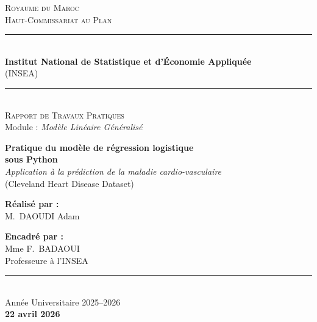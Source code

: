 \documentclass[11pt,a4paper,twoside]{report}
\theoremstyle{definition}
\begin{document}
\begin{titlepage}
  \begin{center}
    \vspace*{0.5cm}
    {\large\textsc{Royaume du Maroc}}\\[0.2cm]
    {\large\textsc{Haut-Commissariat au Plan}}\\[0.4cm]
    \rule{\textwidth}{0.5pt}\\[0.3cm]
    {\Large\bfseries Institut National de Statistique et d'Économie Appliquée}\\[0.15cm]
    {\normalsize (INSEA)}\\[0.2cm]
    \rule{\textwidth}{0.5pt}\\[2.5cm]

    {\large \textsc{Rapport de Travaux Pratiques}}\\[0.6cm]
    {\large Module : \emph{Modèle Linéaire Généralisé}}\\[2.5cm]

    \begin{tcolorbox}[colback=insea!8,colframe=insea,arc=4pt,boxrule=1pt]
    \centering
    {\Huge\bfseries\color{insea} Pratique du modèle de régression logistique\\[0.3em]
    sous Python}\\[0.8em]
    {\Large\itshape Application à la prédiction de la maladie cardio-vasculaire}\\[0.4em]
    {\large (Cleveland Heart Disease Dataset)}
    \end{tcolorbox}

    \vfill

    \begin{minipage}{0.45\textwidth}
      \begin{flushleft}
        \textbf{\large Réalisé par :}\\[0.3em]
        M.\ DAOUDI Adam
      \end{flushleft}
    \end{minipage}
    \hfill
    \begin{minipage}{0.45\textwidth}
      \begin{flushright}
        \textbf{\large Encadré par :}\\[0.3em]
        Mme F.\ BADAOUI\\
        Professeure à l'INSEA
      \end{flushright}
    \end{minipage}

    \vspace{1.5cm}
    \rule{\textwidth}{0.5pt}\\
    {\large Année Universitaire 2025--2026}\\[0.3em]
    \textbf{22 avril 2026}
  \end{center}
\end{titlepage}
\end{document}
